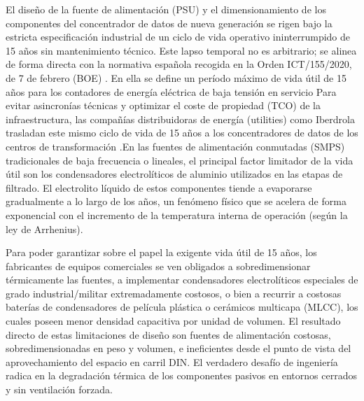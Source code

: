 El diseño de la fuente de alimentación (PSU) y el dimensionamiento de los componentes del concentrador de datos de nueva generación se rigen bajo la estricta especificación industrial de un ciclo de vida operativo ininterrumpido de 15 años sin mantenimiento técnico. Este lapso temporal no es arbitrario; se alinea de forma directa con la normativa española recogida en la Orden ICT/155/2020, de 7 de febrero (BOE) \cite{BOE_ICT155_2020}. En ella se define un período máximo de vida útil de 15 años para los contadores de energía eléctrica de baja tensión en servicio
Para evitar asincronías técnicas y optimizar el coste de propiedad (TCO) de la infraestructura, las compañías distribuidoras de energía (utilities) como Iberdrola trasladan este mismo ciclo de vida de 15 años a los concentradores de datos de los centros de transformación \cite{WorldBank_AMI_Survey}.En las fuentes de alimentación conmutadas (SMPS) tradicionales de baja frecuencia o lineales, el principal factor limitador de la vida útil son los condensadores electrolíticos de aluminio utilizados en las etapas de filtrado. El electrolito líquido de estos componentes tiende a evaporarse gradualmente a lo largo de los años, un fenómeno físico que se acelera de forma exponencial con el incremento de la temperatura interna de operación (según la ley de Arrhenius). 

Para poder garantizar sobre el papel la exigente vida útil de 15 años, los fabricantes de equipos comerciales se ven obligados a sobredimensionar térmicamente las fuentes, a implementar condensadores electrolíticos especiales de grado industrial/militar extremadamente costosos, o bien a recurrir a costosas baterías de condensadores de película plástica o cerámicos multicapa (MLCC), los cuales poseen menor densidad capacitiva por unidad de volumen. El resultado directo de estas limitaciones de diseño son fuentes de alimentación costosas, sobredimensionadas en peso y volumen, e ineficientes desde el punto de vista del aprovechamiento del espacio en carril DIN. El verdadero desafío de ingeniería radica en la degradación térmica de los componentes pasivos en entornos cerrados y sin ventilación forzada.

